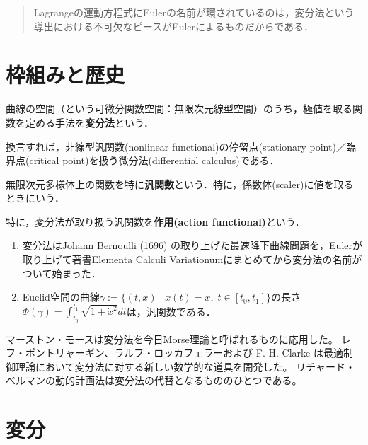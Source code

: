 \documentclass[uplatex, dvipdfmx]{jsreport}
\begin{document}
\begin{quotation}
    Lagrangeの運動方程式にEulerの名前が環されているのは，変分法という導出における不可欠なピースがEulerによるものだからである．
\end{quotation}

\section{枠組みと歴史}

\begin{definition}
    曲線の空間（という可微分関数空間：無限次元線型空間）のうち，極値を取る関数を定める手法を\textbf{変分法}という．

    換言すれば，非線型汎関数(nonlinear functional)の停留点(stationary point)／臨界点(critical point)を扱う微分法(differential calculus)である．
\end{definition}

\begin{definition}[functional]
    無限次元多様体上の関数を特に\textbf{汎関数}という．特に，係数体(scaler)に値を取るときにいう．

    特に，変分法が取り扱う汎関数を\textbf{作用(action functional)}という．
\end{definition}
\begin{example}[汎関数の例]\mbox{}
    \begin{enumerate}
        \item 変分法はJohann Bernoulli (1696) の取り上げた最速降下曲線問題を，Eulerが取り上げて著書Elementa Calculi Variationumにまとめてから変分法の名前がついて始まった．
        \item Euclid空間の曲線$\gamma:=\{(t,x)\mid x(t)=x,\; t\in[t_0,t_1]\}$の長さ$\Phi(\gamma)=\int^{t_1}_{t_0}\sqrt{1+\dot{x}^2}dt$は，汎関数である．
    \end{enumerate}
\end{example}
\begin{history}
    マーストン・モースは変分法を今日Morse理論と呼ばれるものに応用した。
    レフ・ポントリャーギン、ラルフ・ロッカフェラーおよび F. H. Clarke は最適制御理論において変分法に対する新しい数学的な道具を開発した。
    リチャード・ベルマンの動的計画法は変分法の代替となるもののひとつである。
\end{history}

\section{変分}
\end{document}
